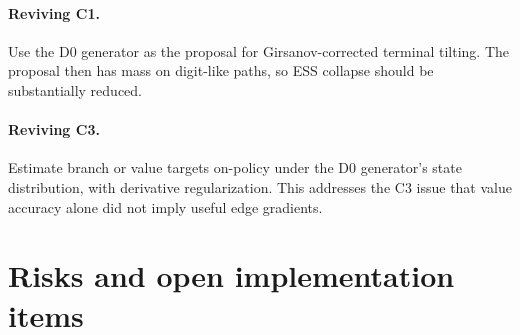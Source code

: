 \documentclass[11pt]{article}
\numberwithin{equation}{section}
\newcommand{\1}{\mathbf 1}
\begin{document}
\paragraph{Reviving C1.}
Use the D0 generator as the proposal for Girsanov-corrected terminal tilting.  The proposal then has mass on digit-like paths, so ESS collapse should be substantially reduced.

\paragraph{Reviving C3.}
Estimate branch or value targets on-policy under the D0 generator's state distribution, with derivative regularization.  This addresses the C3 issue that value accuracy alone did not imply useful edge gradients.

\section{Risks and open implementation items}
\end{document}

